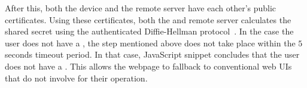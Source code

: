 After this, both the device and the remote server have each other's public
certificates. Using these certificates, both the \device and remote server
calculates the shared secret using the authenticated Diffie-Hellman
protocol~\cite{blake1998authenticated}.
In the case the user does not have a \device, the step mentioned above does not take place within the $5$ seconds timeout period. In that case, \name JavaScript snippet concludes that the user does not have a \device. This allows the webpage to fallback to conventional web UIs that do not involve \device for their operation.



